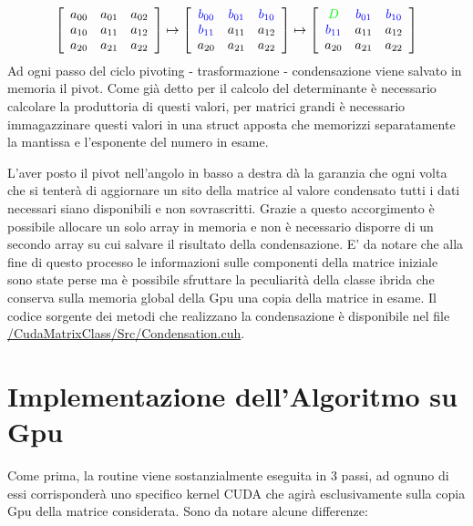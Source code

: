 \documentclass{article}
\begin{document}
\begin{displaymath}
\left[ \begin{array}{ccc} a_{00} & a_{01} & a_{02} \\ a_{10} & a_{11} & a_{12} \\ a_{20} & a_{21} & a_{22}  \end{array} \right] 
\mapsto
\left[ \begin{array}{ccc} \color{blue}b_{00} & \color{blue}b_{01} & \color{blue}b_{10} \\ \color{blue}b_{11} & a_{11} & a_{12} \\ a_{20} & a_{21} & a_{22}  \end{array} \right] 
\mapsto
\left[ \begin{array}{ccc} \color{green}D & \color{blue}b_{01} & \color{blue}b_{10} \\ \color{blue}b_{11} & a_{11} & a_{12} \\ a_{20} & a_{21} & a_{22}  \end{array} \right]
\end{displaymath}
Ad ogni passo del ciclo pivoting - trasformazione - condensazione viene salvato in memoria il pivot. 
\newline
Come già detto per il calcolo del determinante è necessario calcolare la produttoria di questi valori, per matrici grandi è necessario immagazzinare questi valori in una struct apposta che memorizzi separatamente la mantissa e l'esponente del numero in esame.

L'aver posto il pivot nell'angolo in basso a destra dà la garanzia che ogni volta che si tenterà di aggiornare un sito della matrice al valore condensato tutti i dati necessari siano disponibili e non sovrascritti. Grazie a questo accorgimento è possibile allocare un solo array in memoria e non è necessario disporre di un secondo array su cui salvare il risultato della condensazione.
E' da notare che alla fine di questo processo le informazioni sulle componenti della matrice iniziale sono state perse ma è possibile sfruttare la peculiarità della classe ibrida che conserva sulla memoria global della Gpu una copia della matrice in esame.
\newline
Il codice sorgente dei metodi che realizzano la condensazione è disponibile nel file \url{/CudaMatrixClass/Src/Condensation.cuh}.


\section{Implementazione dell'Algoritmo su Gpu}
Come prima, la routine viene sostanzialmente eseguita in 3 passi, ad ognuno di essi corrisponderà uno specifico kernel CUDA che agirà esclusivamente sulla copia Gpu della matrice considerata.
Sono da notare alcune differenze:
\end{document}
